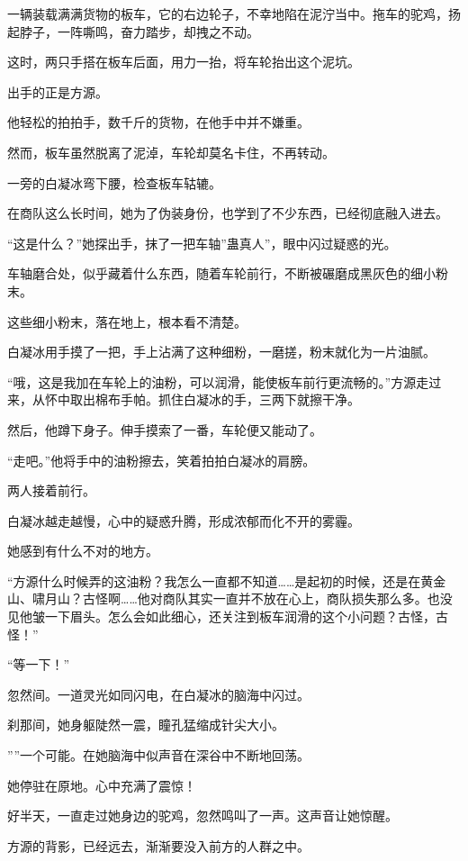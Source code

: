 \begin{this_body}
一辆装载满满货物的板车，它的右边轮子，不幸地陷在泥泞当中。拖车的驼鸡，扬起脖子，一阵嘶鸣，奋力踏步，却拽之不动。

这时，两只手搭在板车后面，用力一抬，将车轮抬出这个泥坑。

出手的正是方源。

他轻松的拍拍手，数千斤的货物，在他手中并不嫌重。

然而，板车虽然脱离了泥淖，车轮却莫名卡住，不再转动。

一旁的白凝冰弯下腰，检查板车轱辘。

在商队这么长时间，她为了伪装身份，也学到了不少东西，已经彻底融入进去。

“这是什么？”她探出手，抹了一把车轴”蛊真人”，眼中闪过疑惑的光。

车轴磨合处，似乎藏着什么东西，随着车轮前行，不断被碾磨成黑灰色的细小粉末。

这些细小粉末，落在地上，根本看不清楚。

白凝冰用手摸了一把，手上沾满了这种细粉，一磨搓，粉末就化为一片油腻。

“哦，这是我加在车轮上的油粉，可以润滑，能使板车前行更流畅的。”方源走过来，从怀中取出棉布手帕。抓住白凝冰的手，三两下就擦干净。

然后，他蹲下身子。伸手摸索了一番，车轮便又能动了。

“走吧。”他将手中的油粉擦去，笑着拍拍白凝冰的肩膀。

两人接着前行。

白凝冰越走越慢，心中的疑惑升腾，形成浓郁而化不开的雾霾。

她感到有什么不对的地方。

“方源什么时候弄的这油粉？我怎么一直都不知道……是起初的时候，还是在黄金山、啸月山？古怪啊……他对商队其实一直并不放在心上，商队损失那么多。也没见他皱一下眉头。怎么会如此细心，还关注到板车润滑的这个小问题？古怪，古怪！”

“等一下！”

忽然间。一道灵光如同闪电，在白凝冰的脑海中闪过。

刹那间，她身躯陡然一震，瞳孔猛缩成针尖大小。

””一个可能。在她脑海中似声音在深谷中不断地回荡。

她停驻在原地。心中充满了震惊！

好半天，一直走过她身边的驼鸡，忽然鸣叫了一声。这声音让她惊醒。

方源的背影，已经远去，渐渐要没入前方的人群之中。


\end{this_body}

